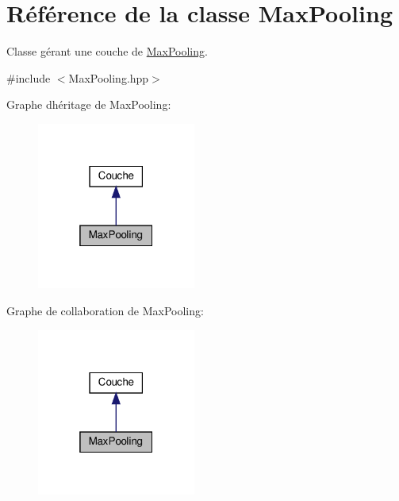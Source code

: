 \hypertarget{classMaxPooling}{}\section{Référence de la classe Max\+Pooling}
\label{classMaxPooling}


Classe gérant une couche de \hyperlink{classMaxPooling}{Max\+Pooling}.  




{\ttfamily \#include $<$Max\+Pooling.\+hpp$>$}



Graphe d\textquotesingle{}héritage de Max\+Pooling\+:
\nopagebreak
\begin{figure}[H]
\begin{center}
\leavevmode
\includegraphics[width=148pt]{classMaxPooling__inherit__graph}
\end{center}
\end{figure}


Graphe de collaboration de Max\+Pooling\+:
\nopagebreak
\begin{figure}[H]
\begin{center}
\leavevmode
\includegraphics[width=148pt]{classMaxPooling__coll__graph}
\end{center}
\end{figure}
